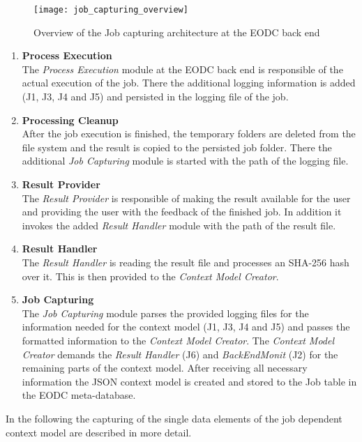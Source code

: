 \documentclass[draft,final]{vutinfth} %
\begin{document}
\begin{figure}[h]
	\centering
	\texttt{[image: job\_capturing\_overview]}
	\caption{Overview of the Job capturing architecture at the EODC back end}
	\label{fig:impljobcapture} %
\end{figure}

\begin{enumerate}
	\item \textbf{Process Execution} \\
	The \textit{Process Execution} module at the EODC back end is responsible of the actual execution of the job. There the additional logging information is added (J1, J3, J4 and J5) and persisted in the logging file of the job. 
	\item \textbf{Processing Cleanup} \\
	After the job execution is finished, the temporary folders are deleted from the file system and the result is copied to the persisted job folder. There the additional \textit{Job Capturing} module is started with the path of the logging file.  
	\item \textbf{Result Provider} \\
	The \textit{Result Provider} is responsible of making the result available for the user and providing the user with the feedback of the finished job. In addition it invokes the added \textit{Result Handler} module with the path of the result file.
	\item \textbf{Result Handler} \\
	The \textit{Result Handler} is reading the result file and processes an SHA-256 hash over it. This is then provided to the \textit{Context Model Creator}.  
	\item \textbf{Job Capturing} \\
	The \textit{Job Capturing} module parses the provided logging files for the information needed for the context model (J1, J3, J4 and J5) and passes the formatted information to the \textit{Context Model Creator}. The \textit{Context Model Creator} demands the \textit{Result Handler} (J6) and \textit{BackEndMonit} (J2) for the remaining parts of the context model. After receiving all necessary information the JSON context model is created and stored to the Job table in the EODC meta-database.    
\end{enumerate}

In the following the capturing of the single data elements of the job dependent context model are described in more detail.
\end{document}
